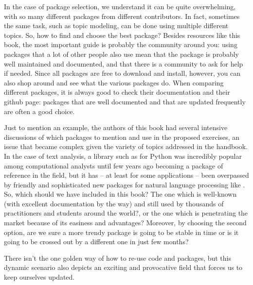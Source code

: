 In the case of package selection, we understand it can be quite overwhelming,
with so many different packages from different contributors.
In fact, sometimes the same task, such as topic modeling,
can be done using multiple different topics.
So, how to find and choose the best package?
Besides resources like this book, the most important guide is probably the community around you:
using packages that a lot of other people also use mean that the package is probably well maintained and documented,
and that there is a community to ask for help if needed.
Since all packages are free to download and install, however, you can also shop around and see what the various packages do.
When comparing different packages, it is always good to check their documentation and their github page:
packages that are well documented and that are updated frequently are often a good choice.

Just to mention an example, the authors of this book had several intensive discussions of which packages to mention and use in the proposed exercises, an issue that became complex given the variety of topics addressed in the handbook. In the case of text analysis, a library such as  for Python was incredibly popular among computational analysts until few years ago becoming a package of reference in the field, but it has -- at least for some applications -- been overpassed by friendly and sophisticated new packages for natural language processing like . So, which should we have included in this book? The one which is well-known (with excellent documentation by the way) and still used by thousands of practitioners and students around the world?, or the one which is penetrating the market because of its easiness and advantages? Moreover, by choosing the second option, are we sure a more trendy package is going to be stable in time or is it going to be crossed out by a different one in just few months?  

There isn't the one golden way of how to re-use code and packages, but this dynamic scenario also depicts an exciting and provocative field that forces us to keep ourselves updated.
